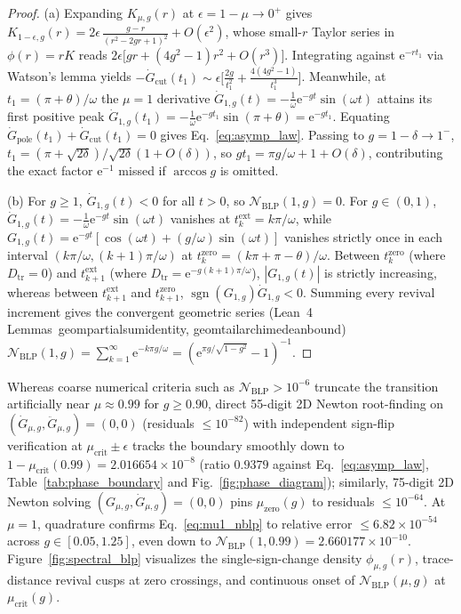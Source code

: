 \documentclass[twocolumn,10pt,amsmath,amssymb,floatfix]{revtex4-2}
\theoremstyle{plain}
\theoremstyle{definition}
\newcommand{\ee}{\mathrm{e}}
\newcommand{\sgn}{\operatorname{sgn}}
\newcommand{\NBLP}{\mathcal{N}_{\mathrm{BLP}}}
\newcommand{\mucrit}{\mu_{\mathrm{crit}}}
\newcommand{\muzero}{\mu_{\mathrm{zero}}}
\newcommand{\leanid}[1]{{\footnotesize\ttfamily\def\_{\textunderscore\penalty0\hspace{0pt}}#1}}
\begin{document}
\begin{proof}
(a) Expanding $K_{\mu,g}(r)$ at $\epsilon = 1 - \mu \to 0^+$ gives $K_{1-\epsilon,g}(r) = 2\epsilon\,\frac{g - r}{(r^2 - 2gr + 1)^2} + O(\epsilon^2)$, whose small-$r$ Taylor series in $\phi(r)=rK$ reads $2\epsilon\big[g r + (4g^2-1)r^2 + O(r^3)\big]$. Integrating against $\ee^{-r t_1}$ via Watson's lemma yields $-\dot{G}_{\mathrm{cut}}(t_1) \sim \epsilon\big[\frac{2g}{t_1^2} + \frac{4(4g^2-1)}{t_1^3}\big]$. Meanwhile, at $t_1 = (\pi + \theta)/\omega$ the $\mu=1$ derivative $\dot{G}_{1,g}(t) = -\frac{1}{\omega}\ee^{-gt}\sin(\omega t)$ attains its first positive peak $\dot{G}_{1,g}(t_1) = -\frac{1}{\omega}\ee^{-gt_1}\sin(\pi+\theta) = \ee^{-gt_1}$. Equating $\dot{G}_{\mathrm{pole}}(t_1) + \dot{G}_{\mathrm{cut}}(t_1) = 0$ gives Eq.~\eqref{eq:asymp_law}. Passing to $g = 1 - \delta \to 1^-$, $t_1 = (\pi + \sqrt{2\delta})/\sqrt{2\delta}(1 + O(\delta))$, so $g t_1 = \pi g/\omega + 1 + O(\delta)$, contributing the exact factor $\ee^{-1}$ missed if $\arccos g$ is omitted.

(b) For $g \ge 1$, $\dot{G}_{1,g}(t) < 0$ for all $t > 0$, so $\NBLP(1,g) = 0$. For $g \in (0,1)$, $\dot{G}_{1,g}(t) = -\frac{1}{\omega}\ee^{-gt}\sin(\omega t)$ vanishes at $t_k^{\mathrm{ext}} = k\pi/\omega$, while $G_{1,g}(t) = \ee^{-gt}[\cos(\omega t) + (g/\omega)\sin(\omega t)]$ vanishes strictly once in each interval $(k\pi/\omega, (k+1)\pi/\omega)$ at $t_k^{\mathrm{zero}} = (k\pi + \pi - \theta)/\omega$. Between $t_k^{\mathrm{zero}}$ (where $D_{\mathrm{tr}}=0$) and $t_{k+1}^{\mathrm{ext}}$ (where $D_{\mathrm{tr}} = \ee^{-g(k+1)\pi/\omega}$), $|G_{1,g}(t)|$ is strictly increasing, whereas between $t_{k+1}^{\mathrm{ext}}$ and $t_{k+1}^{\mathrm{zero}}$, $\sgn(G_{1,g})\dot{G}_{1,g} < 0$. Summing every revival increment gives the convergent geometric series (Lean~4 Lemmas~\leanid{geom\_partial\_sum\_identity}, \leanid{geom\_tail\_archimedean\_bound}) $\NBLP(1, g) = \sum_{k=1}^{\infty} \ee^{-k\pi g/\omega} = (\ee^{\pi g/\sqrt{1-g^2}} - 1)^{-1}$.
\end{proof}

Whereas coarse numerical criteria such as $\NBLP > 10^{-6}$ truncate the transition artificially near $\mu \approx 0.99$ for $g \ge 0.90$, direct 55-digit 2D Newton root-finding on $(\dot{G}_{\mu,g}, \ddot{G}_{\mu,g}) = (0,0)$ (residuals $\le 10^{-82}$) with independent sign-flip verification at $\mucrit \pm \epsilon$ tracks the boundary smoothly down to $1 - \mucrit(0.99) = 2.016654 \times 10^{-8}$ (ratio $0.9379$ against Eq.~\eqref{eq:asymp_law}, Table~\ref{tab:phase_boundary} and Fig.~\ref{fig:phase_diagram}); similarly, 75-digit 2D Newton solving $(G_{\mu,g}, \dot{G}_{\mu,g}) = (0,0)$ pins $\muzero(g)$ to residuals $\le 10^{-64}$. At $\mu=1$, quadrature confirms Eq.~\eqref{eq:mu1_nblp} to relative error $\le 6.82 \times 10^{-54}$ across $g \in [0.05, 1.25]$, even down to $\NBLP(1,0.99) = 2.660177 \times 10^{-10}$. Figure~\ref{fig:spectral_blp} visualizes the single-sign-change density $\phi_{\mu,g}(r)$, trace-distance revival cusps at zero crossings, and continuous onset of $\NBLP(\mu,g)$ at $\mucrit(g)$.
\end{document}
